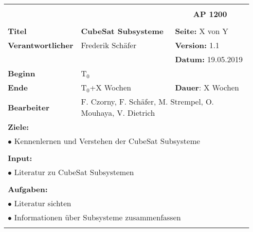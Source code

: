 \clearpage
\begin{table}[!h]
 \begin{center}
  \begin{tabular}{|p{35mm}||p{55mm}|p{50mm}||p{40mm}|}
   \hline
   \multicolumn{3}{|l||}{\textbf{}} & \multicolumn{1}{c|}{}\\
   \multicolumn{3}{|l||}{\textbf{}} & \multicolumn{1}{c|}{\textbf{AP 1200}}\\
   \multicolumn{3}{|l||}{\textbf{}} & \multicolumn{1}{c|}{}\\
   \hline\hline
   \textbf{Titel} & \multicolumn{2}{p{7cm}||}{\textbf{CubeSat Subsysteme}} & \textbf{Seite:} X von Y\\
   \hline
   \textbf{Verantwortlicher} & \multicolumn{2}{l||}{Frederik Schäfer} & \textbf{Version:} 1.1\\
   \hline
   \multicolumn{3}{|l||}{} & \textbf{Datum:} 19.05.2019\\
   \hline\hline
   \textbf{Beginn} & \multicolumn{2}{l||}{T$_0$} & \\
   \hline
   \textbf{Ende} & \multicolumn{2}{l||}{T$_0$+X Wochen} & \textbf{Dauer}: X Wochen\\
   \hline\hline
   \textbf{Bearbeiter} & \multicolumn{3}{l|}{F. Czorny, F. Schäfer, M. Strempel, O. Mouhaya, V. Dietrich}\\
   \hline\hline
   \multicolumn{4}{|p{150mm}|}{\textbf{Ziele:}}\\
   \multicolumn{4}{|p{150mm}|}{$\bullet$ Kennenlernen und Verstehen der CubeSat Subsysteme}\\
   \multicolumn{4}{|p{150mm}|}{}\\
   \multicolumn{4}{|p{150mm}|}{\textbf{Input:}}\\
   \multicolumn{4}{|p{150mm}|}{$\bullet$ Literatur zu CubeSat Subsystemen}\\
   \multicolumn{4}{|p{150mm}|}{}\\
   \multicolumn{4}{|p{150mm}|}{\textbf{Aufgaben:}}\\
   \multicolumn{4}{|p{150mm}|}{$\bullet$ Literatur sichten}\\
   \multicolumn{4}{|p{150mm}|}{$\bullet$ Informationen über Subsysteme zusammenfassen}\\
   \multicolumn{4}{|p{150mm}|}{}\\
   \hline
  \end{tabular}
 \end{center}
\end{table}

